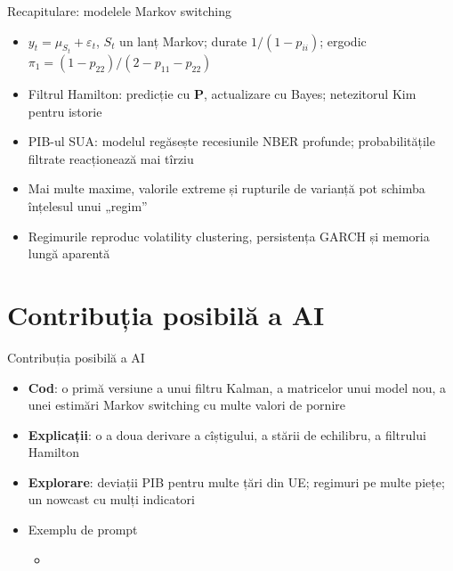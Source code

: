 \begin{frame}{Recapitulare: modelele Markov switching}
\itemsize{\small}
\begin{itemize}
    \item $y_t = \mu_{S_t} + \varepsilon_t$, $S_t$ un lanț Markov; durate $1/(1 - p_{ii})$; ergodic $\pi_1 = (1-p_{22})/(2-p_{11}-p_{22})$
    \item Filtrul Hamilton: predicție cu $\mathbf{P}$, actualizare cu Bayes; netezitorul Kim pentru istorie
    \item PIB-ul SUA: modelul regăsește recesiunile NBER profunde; probabilitățile filtrate reacționează mai tîrziu
    \item Mai multe maxime, valorile extreme și rupturile de varianță pot schimba înțelesul unui „regim”
    \item Regimurile reproduc volatility clustering, persistența GARCH și memoria lungă aparentă
\end{itemize}
\end{frame}


\section{Contribuția posibilă a AI}

\begin{frame}{Contribuția posibilă a AI}
\itemsize{\small}
\begin{itemize}
    \item \textbf{Cod}: o primă versiune a unui filtru Kalman, a matricelor unui model nou, a unei estimări Markov switching cu multe valori de pornire
    \item \textbf{Explicații}: o a doua derivare a cîștigului, a stării de echilibru, a filtrului Hamilton
    \item \textbf{Explorare}: deviații PIB pentru multe țări din UE; regimuri pe multe piețe; un nowcast cu mulți indicatori
    \item Exemplu de prompt
    \begin{itemize}
        \item {}
    \end{itemize}
\end{itemize}
\end{frame}

